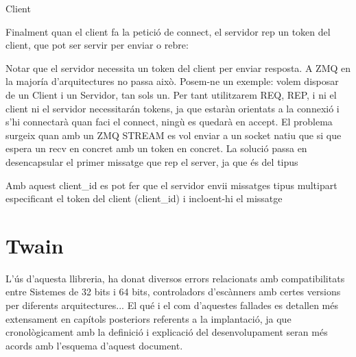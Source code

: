 \documentclass[letterpaper,11pt,catalan]{sphinxmanual}
\begin{document}
Client

\begin{sphinxVerbatim}[commandchars=\\\{\}]
  
  
 
\end{sphinxVerbatim}

Finalment quan el client fa la petició de connect, el servidor rep un token del client, que pot ser servir per enviar o rebre:

\begin{sphinxVerbatim}[commandchars=\\\{\}]
  
\end{sphinxVerbatim}

Notar que el servidor necessita un token del client per enviar resposta. A ZMQ en la majoría d'arquitectures no passa això.
Posem-ne un exemple: volem disposar de un Client i un Servidor, tan sols un. Per tant utilitzarem REQ, REP, i ni el
client ni el servidor necessitarán tokens, ja que estaràn orientats a la connexió i s'hi connectarà quan faci el connect,
ningù es quedarà en accept. El problema surgeix quan amb un ZMQ STREAM es vol enviar a un socket natiu que si que espera
un recv en concret amb un token en concret. La solució passa en desencapsular el primer missatge que rep el server,
ja que és del tipus

\begin{sphinxVerbatim}[commandchars=\\\{\}]
\PYG{p}{[} \PYG{p}{]}
\end{sphinxVerbatim}

Amb aquest client\_id es pot fer que el servidor envii missatges tipus multipart especificant el token del client (client\_id) i
incloent-hi el missatge


\section{Twain}
\label{\detokenize{index:twain}}
L'ús d'aquesta llibreria, ha donat diversos errors relacionats amb compatibilitats entre
Sistemes de 32 bits i 64 bits, controladors d'escànners amb certes versions per
diferents arquitectures... El qué i el com d'aquestes fallades es detallen més extensament
en capítols posteriors referents a la implantació, ja que cronològicament amb la definició
i explicació del desenvolupament seran més acords amb l'esquema d'aquest document.
\end{document}

